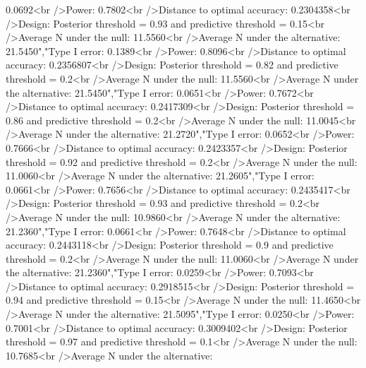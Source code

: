 \begin{Schunk}
0.0692<br />Power: 0.7802<br />Distance to optimal accuracy: 0.2304358<br />Design: Posterior threshold = 0.93 and predictive threshold = 0.15<br />Average N under the null: 11.5560<br />Average N under the alternative: 21.5450","Type I error: 0.1389<br />Power: 0.8096<br />Distance to optimal accuracy: 0.2356807<br />Design: Posterior threshold = 0.82 and predictive threshold = 0.2<br />Average N under the null: 11.5560<br />Average N under the alternative: 21.5450","Type I error: 0.0651<br />Power: 0.7672<br />Distance to optimal accuracy: 0.2417309<br />Design: Posterior threshold = 0.86 and predictive threshold = 0.2<br />Average N under the null: 11.0045<br />Average N under the alternative: 21.2720","Type I error: 0.0652<br />Power: 0.7666<br />Distance to optimal accuracy: 0.2423357<br />Design: Posterior threshold = 0.92 and predictive threshold = 0.2<br />Average N under the null: 11.0060<br />Average N under the alternative: 21.2605","Type I error: 0.0661<br />Power: 0.7656<br />Distance to optimal accuracy: 0.2435417<br />Design: Posterior threshold = 0.93 and predictive threshold = 0.2<br />Average N under the null: 10.9860<br />Average N under the alternative: 21.2360","Type I error: 0.0661<br />Power: 0.7648<br />Distance to optimal accuracy: 0.2443118<br />Design: Posterior threshold = 0.9 and predictive threshold = 0.2<br />Average N under the null: 11.0060<br />Average N under the alternative: 21.2360","Type I error: 0.0259<br />Power: 0.7093<br />Distance to optimal accuracy: 0.2918515<br />Design: Posterior threshold = 0.94 and predictive threshold = 0.15<br />Average N under the null: 11.4650<br />Average N under the alternative: 21.5095","Type I error: 0.0250<br />Power: 0.7001<br />Distance to optimal accuracy: 0.3009402<br />Design: Posterior threshold = 0.97 and predictive threshold = 0.1<br />Average N under the null: 10.7685<br />Average N under the alternative: 
\end{Schunk}
